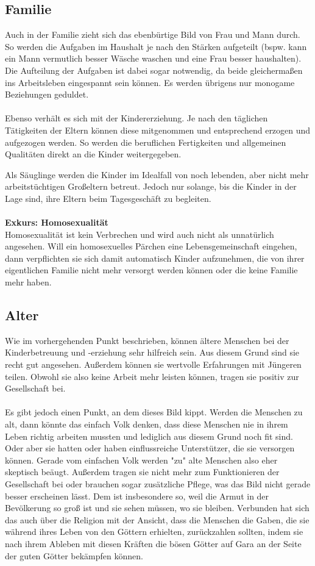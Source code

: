 \subsection{Familie}
Auch in der Familie zieht sich das ebenbürtige Bild von Frau und Mann durch. So werden die Aufgaben im Haushalt je nach den Stärken aufgeteilt (bspw. kann ein Mann vermutlich besser Wäsche waschen und eine Frau besser haushalten). 
Die Aufteilung der Aufgaben ist dabei sogar notwendig, da beide gleichermaßen ins Arbeitsleben eingespannt sein können. 
Es werden übrigens nur monogame Beziehungen geduldet.
\\
\\
Ebenso verhält es sich mit der Kindererziehung. 
Je nach den täglichen Tätigkeiten der Eltern können diese mitgenommen und entsprechend erzogen und aufgezogen werden. 
So werden die beruflichen Fertigkeiten und allgemeinen Qualitäten direkt an die Kinder weitergegeben.

Als Säuglinge werden die Kinder im Idealfall von noch lebenden, aber nicht mehr arbeitstüchtigen Großeltern betreut. 
Jedoch nur solange, bis die Kinder in der Lage sind, ihre Eltern beim Tagesgeschäft zu begleiten.
\\
\\
\textbf{Exkurs: Homosexualität}\\
Homosexualität ist kein Verbrechen und wird auch nicht als unnatürlich angesehen. 
Will ein homosexuelles Pärchen eine Lebensgemeinschaft eingehen, dann verpflichten sie sich damit automatisch Kinder aufzunehmen, die von ihrer eigentlichen Familie nicht mehr versorgt werden können oder die keine Familie mehr haben.

\subsection{Alter}
Wie im vorhergehenden Punkt beschrieben, können ältere Menschen bei der Kinderbetreuung und -erziehung sehr hilfreich sein. 
Aus diesem Grund sind sie recht gut angesehen. Außerdem können sie wertvolle Erfahrungen mit Jüngeren teilen. 
Obwohl sie also keine Arbeit mehr leisten können, tragen sie positiv zur Gesellschaft bei.
\\
\\
Es gibt jedoch einen Punkt, an dem dieses Bild kippt. 
Werden die Menschen zu alt, dann könnte das einfach Volk denken, dass diese Menschen nie in ihrem Leben richtig arbeiten mussten und lediglich aus diesem Grund noch fit sind. 
Oder aber sie hatten oder haben einflussreiche Unterstützer, die sie versorgen können. 
Gerade vom einfachen Volk werden "zu" alte Menschen also eher skeptisch beäugt. 
Außerdem tragen sie nicht mehr zum Funktionieren der Gesellschaft bei oder brauchen sogar zusätzliche Pflege, was das Bild nicht gerade besser erscheinen lässt.
Dem ist insbesondere so, weil die Armut in der Bevölkerung so groß ist und sie sehen müssen, wo sie bleiben. 
Verbunden hat sich das auch über die Religion mit der Ansicht, dass die Menschen die Gaben, die sie während ihres Leben von den Göttern erhielten, zurückzahlen sollten, indem sie nach ihrem Ableben mit diesen Kräften die bösen Götter auf Gara an der Seite der guten Götter bekämpfen können.

